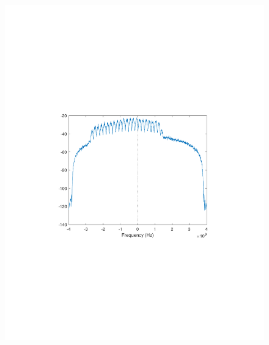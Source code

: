 \begin{refsection}
\begin{figure}[H]
	\centering
	\begin{minipage}{0.30\textwidth}
		\centering
		\includegraphics[clip, trim=4cm 8cm 4cm 8cm, width=1\textwidth]{./sdf/m_qam_system/figures/expResults/intradyne/2_4GBdInSig13dB_AfMF.pdf}
		\label{fig:4GBdEyeMf}
	\end{minipage}
	\begin{minipage}{0.30\textwidth}
		\centering

\end{minipage}
\end{figure}
\end{refsection}
